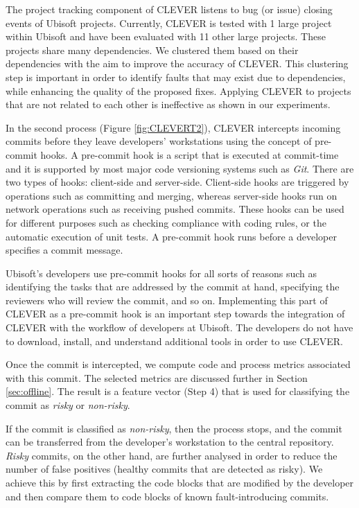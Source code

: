 \documentclass[sigconf]{acmart}
\begin{document}
The project tracking component of CLEVER listens to bug (or issue)
closing events of Ubisoft projects. Currently, CLEVER is tested with 1
large project within Ubisoft and have been evaluated with 11 other large
projects. These projects share many dependencies. We clustered them
based on their dependencies with the aim to improve the accuracy of
CLEVER. This clustering step is important in order to identify faults
that may exist due to dependencies, while enhancing the quality of the
proposed fixes. Applying CLEVER to projects that are not related to each
other is ineffective as shown in our experiments.



In the second process (Figure \ref{fig:CLEVERT2}), CLEVER intercepts
incoming commits before they leave developers' workstations using the
concept of pre-commit hooks. A pre-commit hook is a script that is
executed at commit-time and it is supported by most major code
versioning systems such as \emph{Git}. There are two types of hooks:
client-side and server-side. Client-side hooks are triggered by
operations such as committing and merging, whereas server-side hooks run
on network operations such as receiving pushed commits. These hooks can
be used for different purposes such as checking compliance with coding
rules, or the automatic execution of unit tests. A pre-commit hook runs
before a developer specifies a commit message.

Ubisoft's developers use pre-commit hooks for all sorts of reasons such
as identifying the tasks that are addressed by the commit at hand,
specifying the reviewers who will review the commit, and so on.
Implementing this part of CLEVER as a pre-commit hook is an important
step towards the integration of CLEVER with the workflow of developers
at Ubisoft. The developers do not have to download, install, and
understand additional tools in order to use CLEVER.

Once the commit is intercepted, we compute code and process metrics
associated with this commit. The selected metrics are discussed further
in Section \ref{sec:offline}. The result is a feature vector (Step 4)
that is used for classifying the commit as \emph{risky} or
\emph{non-risky}.

If the commit is classified as \emph{non-risky}, then the process stops,
and the commit can be transferred from the developer's workstation to
the central repository. \emph{Risky} commits, on the other hand, are
further analysed in order to reduce the number of false positives
(healthy commits that are detected as risky). We achieve this by first
extracting the code blocks that are modified by the developer and then
compare them to code blocks of known fault-introducing commits.
\end{document}
